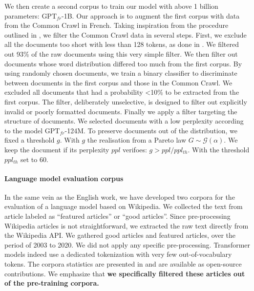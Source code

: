 We then create a second corpus to train our model with above 1 billion parameters: $\text{GPT}_{fr}$-1B. Our approach is to augment the first corpus with data from the Common Crawl in French. Taking inspiration from the procedure outlined in \textcite{brown_20}, we filter the Common Crawl data in several steps. First, we exclude all the documents too short with less than 128 tokens, as done in \textcite{shoeybi_19}. We filtered out 93\% of the raw documents using this very simple filter. We then filter out documents whose word distribution differed too much from the first corpus. By using   randomly chosen documents, we train a binary classifier to discriminate between documents in the first corpus and those in the Common Crawl. We excluded all documents that had a probability <10\% to be extracted from the first corpus. The filter, deliberately unselective, is designed to filter out explicitly invalid or poorly formatted documents. Finally we apply a filter targeting the structure of documents. We selected documents with a low perplexity  according to the model $\text{GPT}_{fr}$-124M. To preserve documents out of the distribution, we fixed a threshold $g$. With $g$ the realisation from a Pareto law $G \sim \mathcal{G}(\alpha)$. We keep the document if its perplexity $ppl$ verifoes: $g > ppl / ppl_{th}$. With the threshold $ppl_{th}$ set to 60. 

\paragraph{Language model evaluation corpus} In the same vein as the English work, we have developed two corpora for the evaluation of a language model based on Wikipedia. We collected the text from article labeled as “featured articles” or “good articles”. Since pre-processing Wikipedia articles is not straightforward, we extracted the raw text directly from the Wikipedia API. We gathered  good articles and  featured articles, over the period of 2003 to 2020. We did not apply any specific pre-processing. Transformer models indeed use a dedicated tokenization with very few out-of-vocabulary tokens. The corpora statistics are presented in  and are available as open-source contributions. We emphasize that \textbf{we specifically filtered these articles out of the pre-training corpora.}

